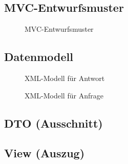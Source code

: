 \subsection{MVC-Entwurfsmuster}
\label{app:MVC}
\begin{figure}[!h]
    \centering
    \caption{MVC-Entwurfsmuster}
\end{figure}
\clearpage

\thispagestyle{empty}

\clearpage

\setcounter{subsection}{9}

\clearpage

\thispagestyle{empty}


\setcounter{subsection}{11}
\subsection{Datenmodell}
\label{app:Datenmodell}
\begin{figure}[h]
    \centering
    \caption{XML-Modell für Antwort}        
\end{figure}
\begin{figure}[!htb]
    \centering
    \caption{XML-Modell für Anfrage}
\end{figure}
\clearpage

\subsection{\acs{DTO} (Ausschnitt)}

\clearpage


\subsection{View (Auszug)}
\label{app:ListingView}

\clearpage

\clearpage

\clearpage

\clearpage

